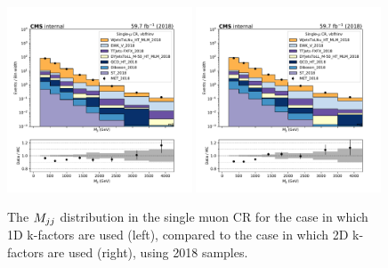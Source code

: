 \begin{figure}
    \begin{center}
        \includegraphics[width=0.49\textwidth]{fig/datamc_1dkfac/cr_1m_vbf/cr_1m_vbf_mjj_losf_2018.pdf}
        \includegraphics[width=0.49\textwidth]{fig/datamc/cr_1m_vbf/cr_1m_vbf_mjj_losf_2018.pdf} 
        \caption{The $M_{jj}$ distribution in the single muon CR for the case in which 1D k-factors are used (left), 
        compared to the case in which 2D k-factors are used (right), using 2018 samples.}
        \label{fig:mjj_2018}
    \end{center}
\end{figure}

